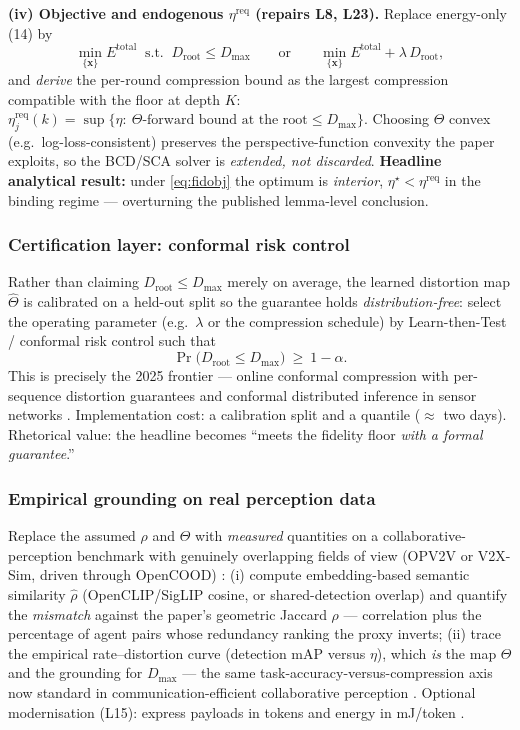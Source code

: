 \documentclass[11pt,a4paper]{article}
\begin{document}
\textbf{(iv) Objective and endogenous $\eta^{\mathrm{req}}$ (repairs L8, L23).} Replace energy-only (14) by
\begin{equation}
\min_{\{\mathbf x\}} E^{\mathrm{total}}\;\;\text{s.t.}\;\;D_{\mathrm{root}}\le D_{\max}
\qquad\text{or}\qquad
\min_{\{\mathbf x\}} E^{\mathrm{total}}+\lambda\,D_{\mathrm{root}},
\label{eq:fidobj}
\end{equation}
and \emph{derive} the per-round compression bound as the largest compression compatible with the floor at depth $K$: $\eta^{\mathrm{req}}_j(k)=\sup\{\eta:\ \Theta\text{-forward bound at the root}\le D_{\max}\}$. Choosing $\Theta$ convex (e.g.\ log-loss-consistent) preserves the perspective-function convexity the paper exploits, so the BCD/SCA solver is \emph{extended, not discarded}. \textbf{Headline analytical result:} under \eqref{eq:fidobj} the optimum is \emph{interior}, $\eta^{\star}<\eta^{\mathrm{req}}$ in the binding regime --- overturning the published lemma-level conclusion.

\subsubsection{Certification layer: conformal risk control}
Rather than claiming $D_{\mathrm{root}}\le D_{\max}$ merely on average, the learned distortion map $\hat\Theta$ is calibrated on a held-out split so the guarantee holds \emph{distribution-free}: select the operating parameter (e.g.\ $\lambda$ or the compression schedule) by Learn-then-Test / conformal risk control \cite{ltt} such that
\begin{equation}
\Pr\big(D_{\mathrm{root}}\le D_{\max}\big)\ \ge\ 1-\alpha .
\label{eq:crc}
\end{equation}
This is precisely the 2025 frontier --- online conformal compression with per-sequence distortion guarantees \cite{zecchin,ppc} and conformal distributed inference in sensor networks \cite{confsensor,cohen}. Implementation cost: a calibration split and a quantile ($\approx$ two days). Rhetorical value: the headline becomes ``meets the fidelity floor \emph{with a formal guarantee}.''

\subsubsection{Empirical grounding on real perception data}
\label{sec:d1emp}
Replace the assumed $\rho$ and $\Theta$ with \emph{measured} quantities on a collaborative-perception benchmark with genuinely overlapping fields of view (OPV2V or V2X-Sim, driven through OpenCOOD) \cite{opv2v,v2xsim}: (i) compute embedding-based semantic similarity $\hat\rho$ (OpenCLIP/SigLIP cosine, or shared-detection overlap) and quantify the \emph{mismatch} against the paper's geometric Jaccard $\rho$ --- correlation plus the percentage of agent pairs whose redundancy ranking the proxy inverts; (ii) trace the empirical rate--distortion curve (detection mAP versus $\eta$), which \emph{is} the map $\Theta$ and the grounding for $D_{\max}$ --- the same task-accuracy-versus-compression axis now standard in communication-efficient collaborative perception \cite{where2comm,rdo,cods,scomcp}. Optional modernisation (L15): express payloads in tokens and energy in mJ/token \cite{edgellm}.
\end{document}
